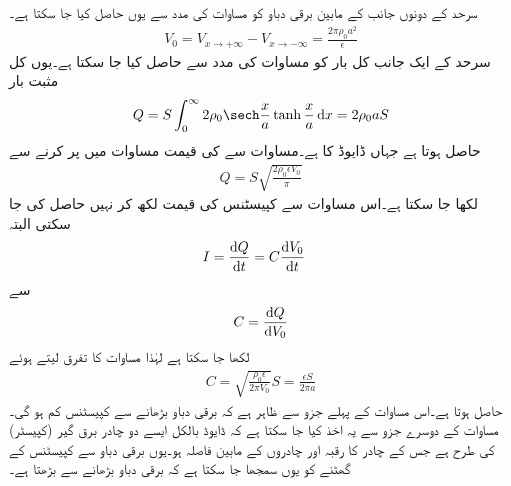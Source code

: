 سرحد کے دونوں جانب کے مابین برقی دباو  کو مساوات  کی مدد سے یوں حاصل کیا جا سکتا ہے۔
\begin{align}\label{مساوات_لاپلاس_ڈایوڈ_اندرونی_دباو}
V_0=V_{x \to +\infty}-V_{x \to -\infty}=\frac{2\pi\rho_0 a^2}{\epsilon}
\end{align}
سرحد کے ایک جانب کل بار کو مساوات  کی مدد سے حاصل کیا جا سکتا ہے۔یوں کل مثبت بار
\begin{align}\label{مساوات_لاپلاس_ڈایوڈ_کل_بار_الف}
Q=S \int_0^{\infty} 2 \rho_0 \sech \frac{x}{a}\tanh \frac{x}{a} \dif x=2\rho_0 a S
\end{align}
حاصل ہوتا ہے جہاں ڈایوڈ کا   ہے۔مساوات  سے  کی قیمت مساوات  میں پر کرنے سے
\begin{align}\label{مساوات_لاپلاس_ڈایوڈ_کل_بار_ب}
Q=S \sqrt{\frac{2\rho_0 \epsilon V_0}{\pi}}
\end{align} 
لکھا جا سکتا ہے۔اس مساوات سے کپیسٹنس کی قیمت  لکھ کر نہیں حاصل کی جا سکتی البتہ
\begin{align*}
I&=\frac{\dif Q}{\dif t} =C \frac{\dif V_0}{\dif t}
\end{align*}
سے
\begin{align*}
C=\frac{\dif Q}{\dif V_0}
\end{align*}
لکھا جا سکتا ہے  لہٰذا مساوات  کا تفرق لیتے ہوئے
\begin{align*}
C=\sqrt{\frac{\rho_0 \epsilon}{2\pi V_0}} S=\frac{\epsilon S}{2\pi a}
\end{align*}
حاصل ہوتا ہے۔اس مساوات  کے پہلے جزو سے ظاہر ہے کہ برقی دباو بڑھانے سے کپیسٹنس کم ہو گی۔مساوات کے دوسرے جزو سے یہ اخذ کیا جا سکتا ہے کہ ڈایوڈ بالکل ایسے  دو چادر برق گیر (کپیسٹر)  کی طرح ہے جس کے چادر کا رقبہ  اور چادروں کے مابین فاصلہ   ہو۔یوں برقی دباو سے کپیسٹنس کے گھٹنے کو یوں سمجھا جا سکتا ہے کہ برقی دباو بڑھانے سے   بڑھتا ہے۔ 

